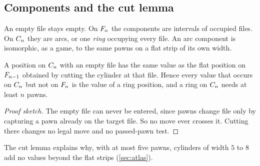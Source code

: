 \subsection{Components and the cut lemma}
\begin{lemma}\label{lem:components}
An empty file stays empty. On $F_{n}$ the components are intervals of occupied files. On $C_{n}$ they
are arcs, or one \emph{ring} occupying every file. An arc component is isomorphic, as a game, to the same
pawns on a flat strip of its own width.
\end{lemma}
\begin{theorem}\label{thm:cut}
A position on $C_{n}$ with an empty file has the same value as the flat position on $F_{n-1}$ obtained
by cutting the cylinder at that file. Hence every value that occurs on $C_{n}$ but not on $F_{n}$ is the
value of a ring position, and a ring on $C_{n}$ needs at least $n$ pawns.
\end{theorem}
\begin{proof}[Proof sketch]
The empty file can never be entered, since pawns change file only by capturing a pawn already on the target
file. So no move ever crosses it. Cutting there changes no legal move and no passed-pawn test.
\end{proof}
The cut lemma explains why, with at most five pawns, cylinders of width $5$ to $8$ add no values beyond the
flat strips (\cref{sec:atlas}).

